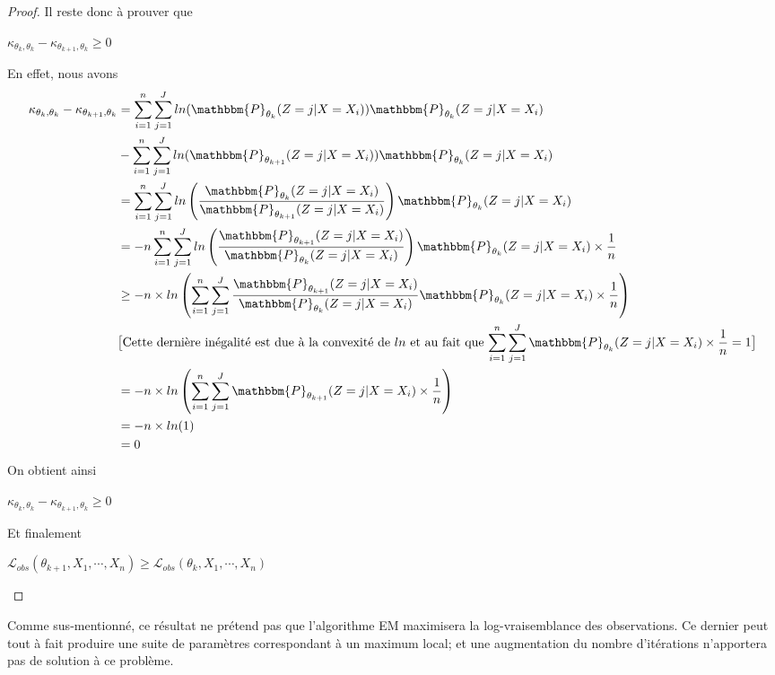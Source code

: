 \documentclass[frenchb]{report}
\newcommand{\1}{\mathbbm{1}}
\newcommand{\prob}{\mathbbm{P}}
\newcommand{\lv}{\mathcal{L}}
\theoremstyle{definition}\newtheorem{defn}{Définition}
\theoremstyle{definition}\newtheorem{exm}{Exemple}
\theoremstyle{definition}\newtheorem{nota}{Notation}
\theoremstyle{definition}\newtheorem{rem}{Remarque}
\begin{document}
\begin{proof}
Il reste donc à prouver que 
\begin{center} $\kappa_{\theta_{k}, \theta_k}-\kappa_{\theta_{k+1}, \theta_k} \geq 0$ \end{center}

En effet, nous avons
\begin{align*}
\kappa_{\theta_{k}, \theta_k}-\kappa_{\theta_{k+1}, \theta_k} &= \sum_{i=1}^n\sum_{j=1}^J ln(\prob_{\theta_k}(Z = j|X=X_i))\prob_{\theta_k}(Z = j|X = X_i) \\
&- \sum_{i=1}^n \sum_{j=1}^J ln(\prob_{\theta_{k+1}}(Z = j|X=X_i))\prob_{\theta_k}(Z = j|X = X_i) \\
&=\sum_{i=1}^n \sum_{j=1}^J ln\left(\frac{\prob_{\theta_k}(Z = j|X=X_i)}{\prob_{\theta_{k+1}}(Z = j|X=X_i)}\right)\prob_{\theta_k}(Z = j|X = X_i)\\
&= - n\sum_{i=1}^n \sum_{j=1}^J ln\left(\frac{\prob_{\theta_{k+1}}(Z = j|X=X_i)}{\prob_{\theta_k}(Z = j|X=X_i)}\right)\prob_{\theta_k}(Z = j|X = X_i)\times\frac{1}{n}\\
&\geq -n\times ln\left( \sum_{i=1}^n\sum_{j=1}^J \frac{\prob_{\theta_{k+1}}(Z = j|X=X_i)}{\prob_{\theta_k}(Z = j|X=X_i)}\prob_{\theta_k}(Z = j|X = X_i)\times\frac{1}{n} \right)\\
&\text{$\big[$Cette dernière inégalité est due à la convexité de $ln$ et au fait que $\displaystyle\sum_{i=1}^n\sum_{j=1}^J\prob_{\theta_k}(Z = j|X=X_i)\times\frac{1}{n}=1\big]$}\\
&= - n\times ln\left( \sum_{i=1}^n\sum_{j=1}^J\prob_{\theta_{k+1}}(Z = j|X=X_i)\times\frac{1}{n}\right)\\
&=  -n\times ln(1)\\
&= 0
\end{align*}
On obtient ainsi
\begin{center} $\kappa_{\theta_{k}, \theta_k}-\kappa_{\theta_{k+1}, \theta_k} \geq 0$ \end{center}
Et finalement
\begin{center} $\lv_{obs}(\theta_{k+1}, X_1, \cdots, X_n) \geq \lv_{obs}(\theta_k, X_1, \cdots, X_n)$ \end{center}
\end{proof}

Comme sus-mentionné, ce résultat ne prétend pas que l'algorithme EM maximisera la log-vraisemblance des observations. Ce dernier peut tout à fait produire une suite de paramètres correspondant à un maximum local; et une augmentation du nombre d'itérations n'apportera pas de solution à ce problème.
\newpage
\end{document}
